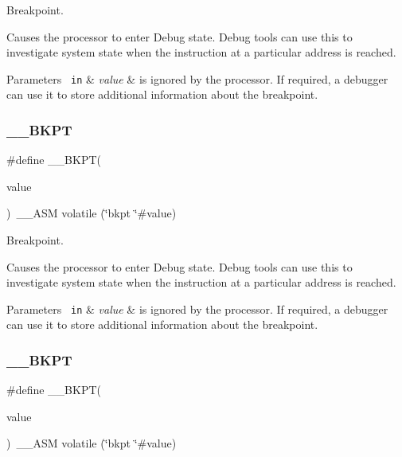Breakpoint. 

Causes the processor to enter Debug state. Debug tools can use this to investigate system state when the instruction at a particular address is reached. 
\begin{DoxyParams}[1]{Parameters}
\mbox{\texttt{ in}}  & {\em value} & is ignored by the processor. If required, a debugger can use it to store additional information about the breakpoint. \\
\hline
\end{DoxyParams}
\mbox{\label{group___c_m_s_i_s___core___instruction_interface_ga15ea6bd3c507d3e81c3b3a1258e46397}} 
\subsubsection{\texorpdfstring{\_\_BKPT}{\_\_BKPT}\hspace{0.1cm}{\footnotesize\ttfamily [3/4]}}
{\footnotesize\ttfamily \#define \+\_\+\+\_\+\+B\+K\+PT(\begin{DoxyParamCaption}\item[{}]{value }\end{DoxyParamCaption})~\+\_\+\+\_\+\+A\+SM volatile (\char`\"{}bkpt \char`\"{}\#value)}



Breakpoint. 

Causes the processor to enter Debug state. Debug tools can use this to investigate system state when the instruction at a particular address is reached. 
\begin{DoxyParams}[1]{Parameters}
\mbox{\texttt{ in}}  & {\em value} & is ignored by the processor. If required, a debugger can use it to store additional information about the breakpoint. \\
\hline
\end{DoxyParams}
\mbox{\label{group___c_m_s_i_s___core___instruction_interface_ga15ea6bd3c507d3e81c3b3a1258e46397}} 
\subsubsection{\texorpdfstring{\_\_BKPT}{\_\_BKPT}\hspace{0.1cm}{\footnotesize\ttfamily [4/4]}}
{\footnotesize\ttfamily \#define \+\_\+\+\_\+\+B\+K\+PT(\begin{DoxyParamCaption}\item[{}]{value }\end{DoxyParamCaption})~\+\_\+\+\_\+\+A\+SM volatile (\char`\"{}bkpt \char`\"{}\#value)}




